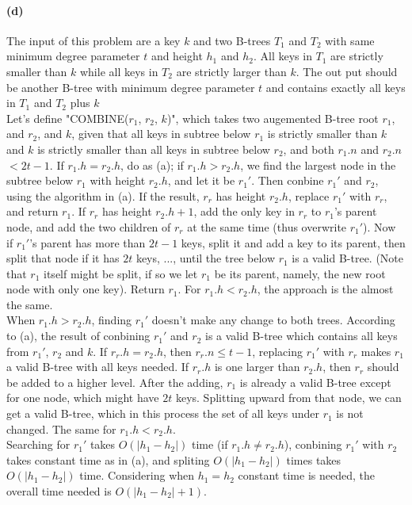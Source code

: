 \documentclass{6046}
\begin{document}
\paragraph{(d)}

The input of this problem are 
a key $k$ and two B-trees 
$T_1$ and $T_2$ with same minimum degree parameter $t$ 
and height $h_1$ and $h_2$. 
All keys in $T_1$ are strictly smaller than $k$
 while all keys in $T_2$ are strictly larger than $k$. 
The out put should be another 
B-tree with minimum degree parameter $t$ 
and contains exactly all 
keys in $T_1$ and $T_2$ plus $k$
\\

Let's define "COMBINE($r_1$, $r_2$, $k$)", 
which takes two augemented B-tree root 
$r_1$, and $r_2$, and $k$, 
given that all keys in subtree below $r_1$ is 
strictly smaller than $k$ and 
$k$ is strictly smaller than all keys in subtree below $r_2$, 
and both $r_1.n$ and $r_2.n$ $<2t-1$. 
If $r_1.h = r_2.h$, 
do as (a); 
if $r_1.h > r_2.h$, 
we find the largest node in the subtree below $r_1$ with height 
$r_2.h$, and let it be $r_1'$. 
Then conbine $r_1'$ and $r_2$, 
using the algorithm in (a). 
If the result, $r_r$ has height $r_2.h$, 
replace $r_1'$ with $r_r$, and 
return $r_1$. 
If $r_r$ has height $r_2.h+1$, 
add the only key in $r_r$ 
to $r_1$'s parent node, 
and add the two children of $r_r$ at the same time 
(thus overwrite $r_1'$). 
Now if $r_1'$'s parent has more than $2t-1$ keys, 
split it and add a key to its parent, 
then split that node if it has $2t$ keys, ..., 
until the tree below $r_1$ is a valid B-tree. 
(Note that $r_1$ itself might be split, 
if so we let $r_1$ be its parent, 
namely, the new root node with only one key). 
Return $r_1$. 
For $r_1.h < r_2.h$, 
the approach is the almost the same. 
\\

When $r_1.h > r_2.h$, 
finding $r_1'$ doesn't make any change to both trees. 
According to (a), 
the result of conbining $r_1'$ and $r_2$ is a valid B-tree 
which contains all keys 
from $r_1'$, $r_2$ and $k$. 
If $r_r.h = r_2.h$, then $r_r.n\leq t-1$, 
replacing $r_1'$ with $r_r$ 
makes $r_1$ a valid B-tree with all keys needed. 
If $r_r.h$ is one larger than $r_2.h$, 
then $r_r$ should be added to a higher level. 
After the adding, 
$r_1$ is already a valid B-tree except for one node, 
which might have $2t$ keys. 
Splitting upward from that node, we can get a valid B-tree, 
which in this process the set of all keys under $r_1$ 
is not changed. 
The same for $r_1.h < r_2.h$. 
\\

Searching for $r_1'$ takes $O(|h_1 - h_2|)$ time
(if $r_1.h \neq r_2.h$), 
conbining $r_1'$ with $r_2$ takes constant time as in (a), 
and spliting $O(|h_1 - h_2|)$ times takes 
$O(|h_1 - h_2|)$ time. 
Considering when $h_1 = h_2$ constant time is needed, 
the overall time needed is 
$O(|h_1 - h_2| + 1)$. 
\end{document}
